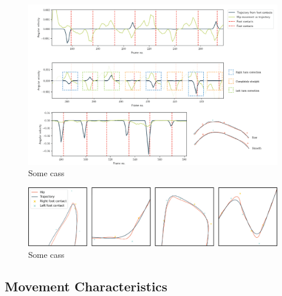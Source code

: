 \begin{figure}
    \centering
    \includegraphics[width=1.0\columnwidth]{img/estimated_trajectory_angular_velocity.png}
    \caption{Some cass}
    \label{fig:results:estimatedtrajectory:stats}
\end{figure}
\begin{figure}
    \centering
    \includegraphics[width=1.0\linewidth]{img/estimated_trajectory_examples.png}
    \caption{Some cass}
    \label{fig:results:estimatedtrajectory:examples}
\end{figure}

\subsection{Movement Characteristics}


